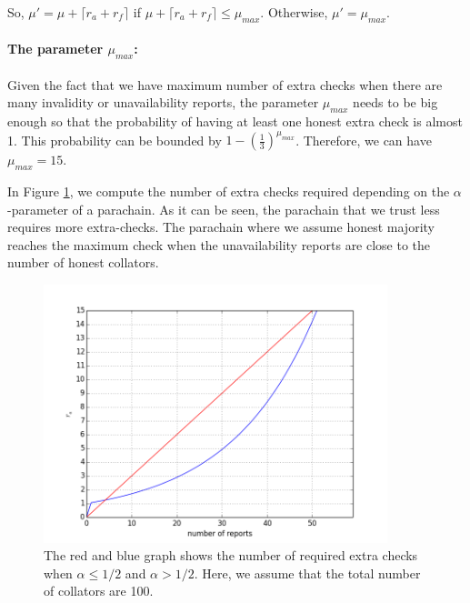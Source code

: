 So, $\mu' = \mu + \lceil r_a + r_f \rceil$ if $\mu + \lceil r_a + r_f \rceil \leq \mu_{max}$. Otherwise, $\mu' = \mu_{max}$.


\paragraph{The parameter $\mu_{max}$:} Given the fact that we have maximum number of extra checks when there are many invalidity or unavailability  reports, the parameter $\mu_{max}$ needs to be big enough so that the probability of having at least one honest extra check is almost 1.
This probability can be bounded by $1-(\frac{1}{3})^{\mu_{max}}$. Therefore, we can have $\mu_{max} = 15$.

In Figure \ref{fig:ra}, we compute the number of extra checks required depending on the $\alpha$-parameter of a parachain. As it can be seen, the parachain that we trust less requires more extra-checks. The parachain where we assume honest majority reaches the maximum check when the unavailability reports are close to the number of honest collators.  


\begin{figure}[h]\centering
	  \includegraphics[width=10cm]{images/ra.png}
	  \caption{The red and blue graph shows the number of required extra checks when $\alpha \leq 1/2$ and $\alpha > 1/2$. Here, we assume that the total number of collators are 100.}
	  \label{fig:ra}
\end{figure}

